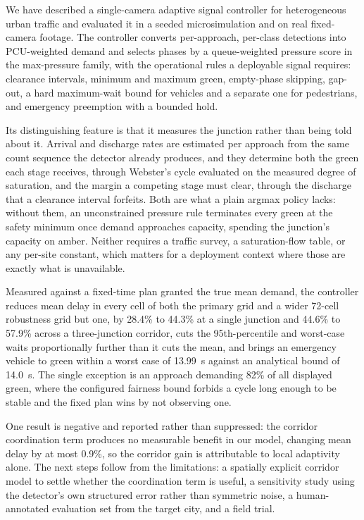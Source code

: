 \documentclass[journal]{IEEEtran}
\newcommand{\pcu}{PCU}
\begin{document}
We have described a single-camera adaptive signal controller for heterogeneous urban traffic and
evaluated it in a seeded microsimulation and on real fixed-camera footage. The controller converts
per-approach, per-class detections into \pcu-weighted demand and selects phases by a queue-weighted
pressure score in the max-pressure family, with the operational rules a deployable signal requires:
clearance intervals, minimum and maximum green, empty-phase skipping, gap-out, a hard maximum-wait bound
for vehicles and a separate one for pedestrians, and emergency preemption with a bounded hold.

Its distinguishing feature is that it measures the junction rather than being told about it. Arrival and
discharge rates are estimated per approach from the same count sequence the detector already produces,
and they determine both the green each stage receives, through Webster's cycle evaluated on the measured
degree of saturation, and the margin a competing stage must clear, through the discharge that a clearance
interval forfeits. Both are what a plain argmax policy lacks: without them, an unconstrained pressure
rule terminates every green at the safety minimum once demand approaches capacity, spending the
junction's capacity on amber. Neither requires a traffic survey, a saturation-flow table, or any
per-site constant, which matters for a deployment context where those are exactly what is unavailable.

Measured against a fixed-time plan granted the true mean demand, the controller reduces mean delay in
every cell of both the primary grid and a wider 72-cell robustness grid but one, by 28.4\% to 44.3\% at a
single junction and 44.6\% to 57.9\% across a three-junction corridor, cuts the 95th-percentile and
worst-case waits proportionally further than it cuts the mean, and brings an emergency vehicle to green
within a worst case of 13.99~s against an analytical bound of 14.0~s. The single exception is an
approach demanding 82\% of all displayed green, where the configured fairness bound forbids a cycle long
enough to be stable and the fixed plan wins by not observing one.

One result is negative and reported rather than suppressed: the corridor coordination term produces no
measurable benefit in our model, changing mean delay by at most 0.9\%, so the corridor gain is
attributable to local adaptivity alone. The next steps follow from the limitations: a spatially explicit
corridor model to settle whether the coordination term is useful, a sensitivity study using the
detector's own structured error rather than symmetric noise, a human-annotated evaluation set from the
target city, and a field trial.
\end{document}
